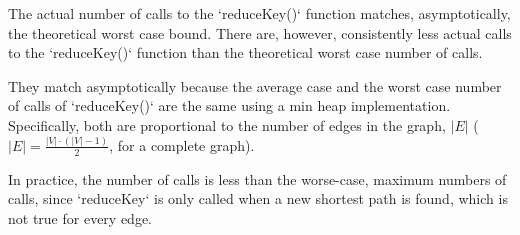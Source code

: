 \documentclass[12pt, letterpaper]{article}
\begin{document}
\begin{enumerate}
The actual number of calls to the `reduceKey()` function matches, asymptotically, the theoretical worst case bound. There are, however, consistently less actual calls to the `reduceKey()` function than the theoretical worst case number of calls.

They match asymptotically because the average case and the worst case number of calls of `reduceKey()` are the same using a min heap implementation. Specifically, both are proportional to the number of edges in the graph, \(|E|\) (\(|E| = \frac{|V| \cdot (|V| - 1)}{2}\), for a complete graph). 

In practice, the number of calls is less than the worse-case, maximum numbers of calls, since `reduceKey` is only called when a new shortest path is found, which is not true for every edge.



\end{enumerate}
\end{document}
